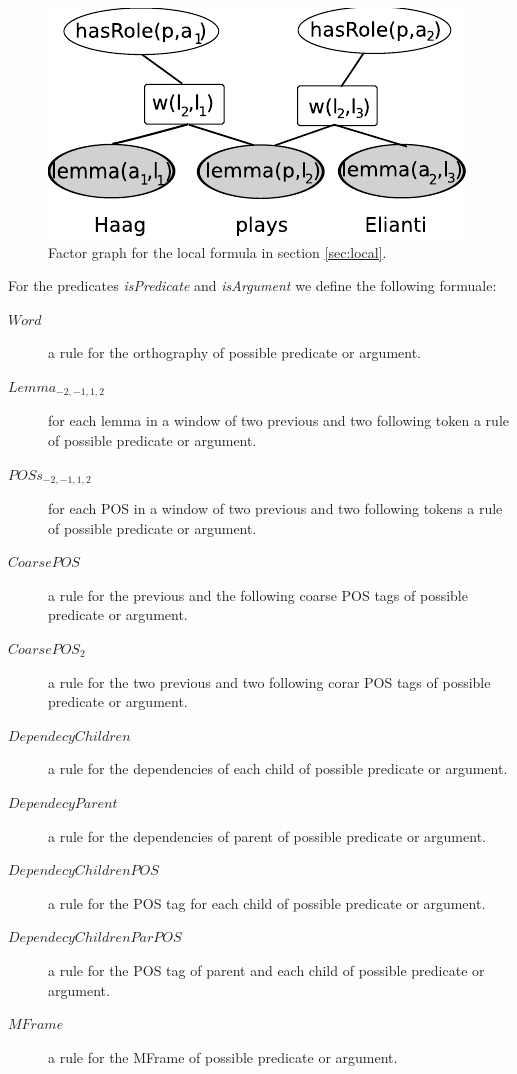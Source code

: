 \begin{figure}
\begin{center}
    \includegraphics[scale=.70]{LocalFormula2}
\end{center}
\caption{Factor graph for the local formula in section \ref{sec:local}.}
\label{fig:local2}
\end{figure}

For the predicates \emph{isPredicate} and \emph{isArgument} we define the
following formuale:
\begin{description}
    \item[$Word$] a rule for the orthography of possible predicate or argument.
    \item[$Lemma_{-2,-1,1,2}$] for each lemma in a window of two previous and two following token a rule of possible predicate or argument.
    \item[$POSs_{-2,-1,1,2}$] for each POS in a window of two previous and two following tokens a rule of possible predicate or argument.
    \item[$CoarsePOS$] a rule for the previous and the following coarse POS tags of possible predicate or argument.
    \item[$CoarsePOS_2$] a rule for the two previous and two following corar POS tags of possible predicate or argument.
    \item[$DependecyChildren$] a rule for the dependencies of each child of possible predicate or argument.
    \item[$DependecyParent$] a rule for the dependencies of parent of possible predicate or argument.
    \item[$DependecyChildrenPOS$] a rule for the POS tag for each child  of possible predicate or argument.
    \item[$DependecyChildrenParPOS$] a rule for the POS tag of parent and each child  of possible predicate or argument.
    \item[$MFrame$] a rule for the MFrame of possible predicate or argument.
\end{description}

